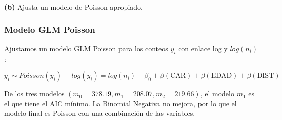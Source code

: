\begin{myblock}
    
    \textbf{(b)} Ajusta un modelo de Poisson apropiado. 

\end{myblock}

\subsubsection{Modelo GLM Poisson}

Ajustamos un modelo GLM Poisson para los conteos $y_i$ con enlace log y  $log(n_i)$:

\[
    y_i \sim Poisson(y_i) \;\;\;\;\; log(y_i) = log(n_i) + \beta_0 + \beta(\text{CAR}) + \beta(\text{EDAD}) + \beta(\text{DIST})
\]

De los tres modelos $(m_0 = 378.19, m_1 = 208.07, m_2 = 219.66)$, el modelo $m_1$ es el que tiene el AIC mínimo. 
La Binomial Negativa no mejora, por lo que el modelo final es Poisson con una combinación de las variables. 

